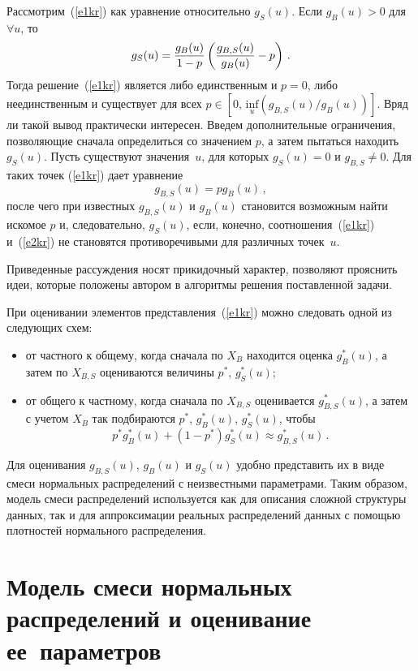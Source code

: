 \begin{multicols}{2}
     Рассмотрим~(\ref{e1kr}) как уравнение относительно $g_S(u)$. Если 
$g_B(u)>0$ для $\forall u$, то 
     $$
     g_S (u) = \displaystyle\frac{\displaystyle g_B(u)\mathstrut}{\displaystyle 1-p\mathstrut}\left (\displaystyle\frac{\displaystyle g_{B,S}(u)\mathstrut}{\displaystyle g_B(u)\mathstrut} -p\right )\,.
     $$
     Тогда решение~(\ref{e1kr}) является либо единственным и $p=0$, либо 
     неединственным и существует для всех 
     $p\in [0,\,\underset{u}{\mathrm{inf}} (g_{B,S}(u)/g_B(u))]$. Вряд ли такой 
вывод практически интересен. Введем дополнительные ограничения, 
позволяющие сначала определиться со значением $p$, а затем пытаться находить 
$g_S(u)$. Пусть существуют значения~$u$, для которых $g_S(u)=0$ и $g_{B,S} 
\not= 0$. Для таких точек (\ref{e1kr}) дает уравнение
     \begin{equation} %
     g_{B,S}(u) =pg_B(u)\,,
     \label{e2kr}
     \end{equation}
после чего при известных $g_{B,S}(u)$ и $g_B(u)$ становится возможным найти 
искомое $p$ и, следовательно, $g_S(u)$, если, конечно, соотношения~(\ref{e1kr}) 
и~(\ref{e2kr}) не становятся противоречивыми для различных точек~$u$.
     
     Приведенные рассуждения носят прикидочный характер, позволяют 
прояснить идеи, которые положены автором в алгоритмы решения поставленной 
задачи.
     
     При оценивании элементов представления~(\ref{e1kr}) можно следовать 
одной из следующих схем:
     \begin{itemize}
\item от частного к общему, когда сначала по $X_B$ находится оценка 
$g_B^*(u)$, а затем по $X_{B,S}$ оцениваются величины  $p^*$, $g_S^*(u)$;
\item от общего к частному, когда сначала по $X_{B,S}$ оценивается 
$g_{B,S}^*(u)$, а затем с учетом $X_B$ так подбираются $p^*$, $g_B^*(u)$, 
$g_S^*(u)$, чтобы  
$$
p^*g_B^*(u)+(1-p^*)g_S^*(u)\approx g_{B,S}^*(u)\,.
$$
     \end{itemize}
     
     Для оценивания $g_{B,S}(u)$, $g_B(u)$ и $g_S(u)$ удобно представить их в 
виде смеси нормальных распределений с неизвестными параметрами. Таким 
образом, модель смеси распределений используется как для описания сложной 
структуры данных, так и для аппроксимации реальных распределений данных с 
помощью плотностей нормального распределения.

\section{Модель смеси нормальных распределений и 
оценивание ее~параметров}
     

\end{multicols}
